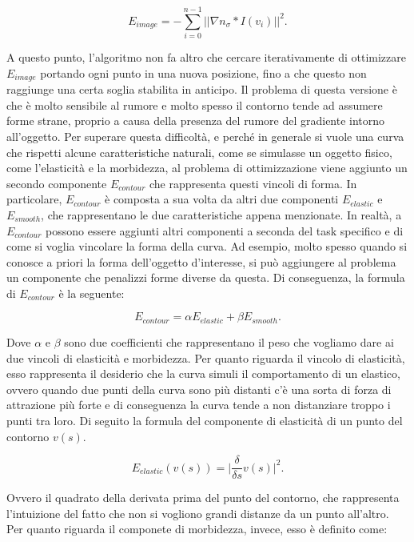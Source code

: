 \begin{equation}
    E_{image} = -\sum_{i=0}^{n-1}{||\nabla n_{\sigma} \ast I(v_{i})||^{2}}.
\end{equation}

A questo punto, l'algoritmo non fa altro che cercare iterativamente di ottimizzare $E_{image}$ portando ogni punto in una nuova posizione, fino a che questo non raggiunge una certa soglia stabilita in anticipo. Il problema di questa versione è che è molto sensibile al rumore e molto spesso il contorno tende ad assumere forme strane, proprio a causa della presenza del rumore del gradiente intorno all'oggetto. 
Per superare questa difficoltà, e perché in generale si vuole una curva che rispetti alcune caratteristiche naturali, come se simulasse un oggetto fisico, come l'elasticità e la morbidezza, al problema di ottimizzazione viene aggiunto un secondo componente $E_{contour}$ che rappresenta questi vincoli di forma.
In particolare, $E_{contour}$ è composta a sua volta da altri due componenti $E_{elastic}$ e $E_{smooth}$, che rappresentano le due caratteristiche appena menzionate. In realtà, a $E_{contour}$ possono essere aggiunti altri componenti a seconda del task specifico e di come si voglia vincolare la forma della curva. Ad esempio, molto spesso quando si conosce a priori la forma dell'oggetto d'interesse, si può aggiungere al problema un componente che penalizzi forme diverse da questa. Di conseguenza, la formula di $E_{contour}$ è la seguente:

\begin{equation}
    E_{contour} = \alpha E_{elastic} + \beta E_{smooth}.
\end{equation}

Dove $\alpha$ e $\beta$ sono due coefficienti che rappresentano il peso che vogliamo dare ai due vincoli di elasticità e morbidezza.
Per quanto riguarda il vincolo di elasticità, esso rappresenta il desiderio che la curva simuli il comportamento di un elastico, ovvero quando due punti della curva sono più distanti c'è una sorta di forza di attrazione più forte e di conseguenza la curva tende a non distanziare troppo i punti tra loro. Di seguito la formula del componente di elasticità di un punto del contorno $v(s)$.

\begin{equation}
    E_{elastic}(v(s)) = \bigg|  \frac{\delta}{\delta s} v(s)  \bigg|^{2}.
\end{equation}


Ovvero il quadrato della derivata prima del punto del contorno, che rappresenta l'intuizione del fatto che non si vogliono grandi distanze da un punto all'altro. Per quanto riguarda il componete di morbidezza, invece, esso è definito come:


